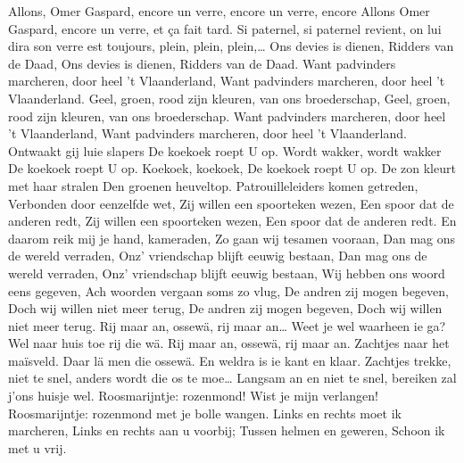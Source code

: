 \documentclass{article}
\begin{document}
\begin{songs}{}
\endsong 
{}
\beginverse*
Allons, Omer Gaspard,
encore un verre,
encore un verre, encore
Allons Omer Gaspard,
encore un verre,
et ça fait tard.
\endverse
\beginverse*
Si paternel,
si paternel revient,
on lui dira
son verre est toujours,
plein, plein, plein,…
\endverse
\endsong 
{}
\beginverse*
Ons devies is dienen, Ridders van de Daad,
Ons devies is dienen, Ridders van de Daad.
Want padvinders marcheren, door heel 't Vlaanderland,
Want padvinders marcheren, door heel 't Vlaanderland.
Geel, groen, rood zijn kleuren, van ons broederschap,
Geel, groen, rood zijn kleuren, van ons broederschap.
Want padvinders marcheren, door heel 't Vlaanderland,
Want padvinders marcheren, door heel 't Vlaanderland.
\endverse
\endsong 
{}
\beginverse*
Ontwaakt gij luie slapers
De koekoek roept U op.
\endverse
\beginverse*
Wordt wakker, wordt wakker
De koekoek roept U op. 
\endverse
\beginverse*
Koekoek, koekoek,
De koekoek roept U op. 
\endverse
\beginverse*
De zon kleurt met haar stralen
Den groenen heuveltop.
\endverse
\endsong 
{}
\beginverse*
Patrouilleleiders komen getreden,
Verbonden door eenzelfde wet,
Zij willen een spoorteken wezen,
Een spoor dat de anderen redt,
Zij willen een spoorteken wezen,
Een spoor dat de anderen redt.
\endverse
\beginverse*
En daarom reik mij je hand, kameraden,
Zo gaan wij tesamen vooraan,
Dan mag ons de wereld verraden,
Onz’ vriendschap blijft eeuwig bestaan,
Dan mag ons de wereld verraden,
Onz’ vriendschap blijft eeuwig bestaan,
\endverse
\beginverse*
Wij hebben ons woord eens gegeven, 
Ach woorden vergaan soms zo vlug,
De andren zij mogen begeven,
Doch wij willen niet meer terug,
De andren zij mogen begeven,
Doch wij willen niet meer terug.
\endverse
\endsong 
{}
\beginverse*
Rij maar an, ossewä, rij maar an… 
Weet je wel waarheen ie ga?
Wel naar huis toe rij die wä.
Rij maar an, ossewä, rij maar an.
\endverse
\beginverse*
Zachtjes naar het maïsveld. 
Daar lä men die ossewä.
En weldra is ie kant en klaar.
\endverse
\beginverse*
Zachtjes trekke, niet te snel,
anders wordt die os te moe…
Langsam an en niet te snel,
bereiken zal j’ons huisje wel.
\endverse
\endsong 
{}
\beginverse*
Roosmarijntje: rozenmond!
Wist je mijn verlangen!
Roosmarijntje: rozenmond
met je bolle wangen.
\endverse
\beginchorus
Links en rechts moet ik marcheren,
Links en rechts aan u voorbij;
Tussen helmen en geweren,
Schoon ik met u vrij.
\endchorus
\beginverse*

\end{songs}
\end{document}
